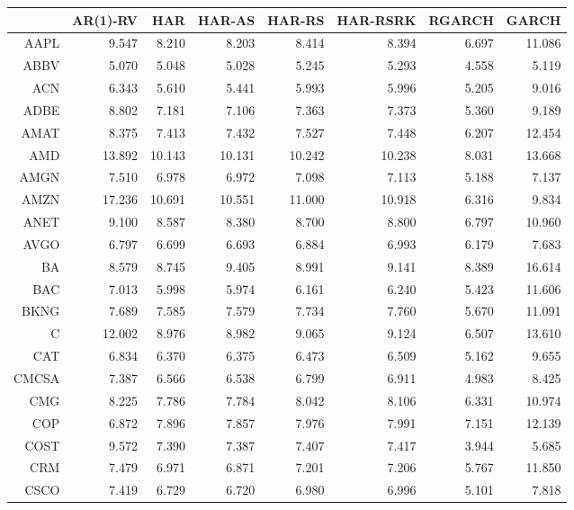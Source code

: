 \begin{table}[ht]
\centering
\begin{tabular}{rrrrrrrr}
  \hline
 & AR(1)-RV & HAR & HAR-AS & HAR-RS & HAR-RSRK & RGARCH & GARCH \\ 
  \hline
AAPL & 9.547 & 8.210 & 8.203 & 8.414 & 8.394 & 6.697 & 11.086 \\ 
  ABBV & 5.070 & 5.048 & 5.028 & 5.245 & 5.293 & 4.558 & 5.119 \\ 
  ACN & 6.343 & 5.610 & 5.441 & 5.993 & 5.996 & 5.205 & 9.016 \\ 
  ADBE & 8.802 & 7.181 & 7.106 & 7.363 & 7.373 & 5.360 & 9.189 \\ 
  AMAT & 8.375 & 7.413 & 7.432 & 7.527 & 7.448 & 6.207 & 12.454 \\ 
  AMD & 13.892 & 10.143 & 10.131 & 10.242 & 10.238 & 8.031 & 13.668 \\ 
  AMGN & 7.510 & 6.978 & 6.972 & 7.098 & 7.113 & 5.188 & 7.137 \\ 
  AMZN & 17.236 & 10.691 & 10.551 & 11.000 & 10.918 & 6.316 & 9.834 \\ 
  ANET & 9.100 & 8.587 & 8.380 & 8.700 & 8.800 & 6.797 & 10.960 \\ 
  AVGO & 6.797 & 6.699 & 6.693 & 6.884 & 6.993 & 6.179 & 7.683 \\ 
  BA & 8.579 & 8.745 & 9.405 & 8.991 & 9.141 & 8.389 & 16.614 \\ 
  BAC & 7.013 & 5.998 & 5.974 & 6.161 & 6.240 & 5.423 & 11.606 \\ 
  BKNG & 7.689 & 7.585 & 7.579 & 7.734 & 7.760 & 5.670 & 11.091 \\ 
  C & 12.002 & 8.976 & 8.982 & 9.065 & 9.124 & 6.507 & 13.610 \\ 
  CAT & 6.834 & 6.370 & 6.375 & 6.473 & 6.509 & 5.162 & 9.655 \\ 
  CMCSA & 7.387 & 6.566 & 6.538 & 6.799 & 6.911 & 4.983 & 8.425 \\ 
  CMG & 8.225 & 7.786 & 7.784 & 8.042 & 8.106 & 6.331 & 10.974 \\ 
  COP & 6.872 & 7.896 & 7.857 & 7.976 & 7.991 & 7.151 & 12.139 \\ 
  COST & 9.572 & 7.390 & 7.387 & 7.407 & 7.417 & 3.944 & 5.685 \\ 
  CRM & 7.479 & 6.971 & 6.871 & 7.201 & 7.206 & 5.767 & 11.850 \\ 
  CSCO & 7.419 & 6.729 & 6.720 & 6.980 & 6.996 & 5.101 & 7.818 \\ 

\end{tabular}
\end{table}
